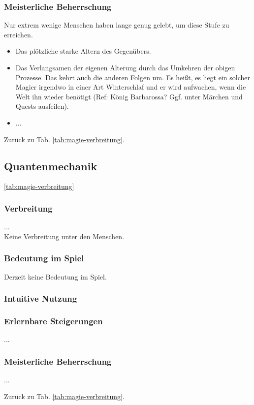 \subsubsection{Meisterliche Beherrschung} 
Nur extrem wenige Menschen haben lange genug gelebt, um diese Stufe zu erreichen.
\begin{itemize}
	\item Das plötzliche starke Altern des Gegenübers.
	\item Das Verlangsamen der eigenen Alterung durch das Umkehren der obigen Prozesse. Das kehrt auch die anderen Folgen um. Es heißt, es liegt ein solcher Magier irgendwo in einer Art Winterschlaf und er wird aufwachen, wenn die Welt ihn wieder benötigt (Ref: König Barbarossa? Ggf. unter Märchen und Quests ausfeilen). %
	\item ...
\end{itemize}
Zurück zu Tab. \ref{tab:magie-verbreitung}.



\subsection{Quantenmechanik}\label{sec:quantenmechanikmagie} \ref{tab:magie-verbreitung} %

\subsubsection{Verbreitung}
...\\
Keine Verbreitung unter den Menschen.

\subsubsection{Bedeutung im Spiel}
Derzeit keine Bedeutung im Spiel.

\subsubsection{Intuitive Nutzung}

\subsubsection{Erlernbare Steigerungen}
\begin{outline}
	\1 ...
\end{outline}

\subsubsection{Meisterliche Beherrschung} 
\begin{outline}
	\1 ...
\end{outline}
Zurück zu Tab. \ref{tab:magie-verbreitung}.



